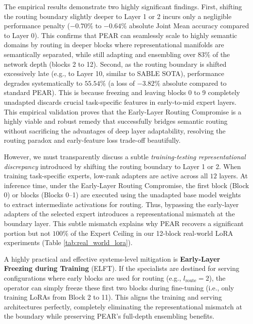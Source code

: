 The empirical results demonstrate two highly significant findings. First, shifting the routing boundary slightly deeper to Layer 1 or 2 incurs only a negligible performance penalty ($-0.70\%$ to $-0.64\%$ absolute Joint Mean accuracy compared to Layer 0). This confirms that PEAR can seamlessly scale to highly semantic domains by routing in deeper blocks where representational manifolds are semantically separated, while still adapting and ensembling over $83\%$ of the network depth (blocks 2 to 12). Second, as the routing boundary is shifted excessively late (e.g., to Layer 10, similar to SABLE SOTA), performance degrades systematically to $55.54\%$ (a loss of $-3.82\%$ absolute compared to standard PEAR). This is because freezing and leaving blocks 0 to 9 completely unadapted discards crucial task-specific features in early-to-mid expert layers. This empirical validation proves that the Early-Layer Routing Compromise is a highly viable and robust remedy that successfully bridges semantic routing without sacrificing the advantages of deep layer adaptability, resolving the routing paradox and early-feature loss trade-off beautifully.

However, we must transparently discuss a subtle \emph{training-testing representational discrepancy} introduced by shifting the routing boundary to Layer 1 or 2. When training task-specific experts, low-rank adapters are active across all $12$ layers. At inference time, under the Early-Layer Routing Compromise, the first block (Block 0) or blocks (Blocks 0--1) are executed using the unadapted base model weights to extract intermediate activations for routing. Thus, bypassing the early-layer adapters of the selected expert introduces a representational mismatch at the boundary layer. This subtle mismatch explains why PEAR recovers a significant portion but not $100\%$ of the Expert Ceiling in our 12-block real-world LoRA experiments (Table \ref{tab:real_world_lora}). 

A highly practical and effective systems-level mitigation is \textbf{Early-Layer Freezing during Training} (ELFT). If the specialists are destined for serving configurations where early blocks are used for routing (e.g., $l_{\text{route}} = 2$), the operator can simply freeze these first two blocks during fine-tuning (i.e., only training LoRAs from Block 2 to 11). This aligns the training and serving architectures perfectly, completely eliminating the representational mismatch at the boundary while preserving PEAR's full-depth ensembling benefits.

